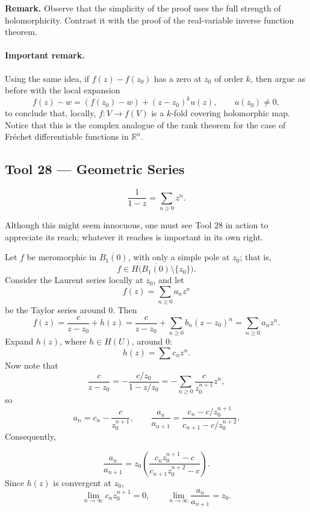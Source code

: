 \documentclass[11pt,a4paper]{article}
\begin{document}
\textbf{Remark.}
Observe that the simplicity of the proof uses the full strength of holomorphicity. Contrast it with the proof of the real-variable inverse function theorem.

\paragraph{Important remark.}
Using the same idea, if $f(z)-f(z_0)$ has a zero at $z_0$ of order $k$, then argue as before with the local expansion
\[
  f(z)-w=(f(z_0)-w)
  +(z-z_0)^k u(z),\qquad u(z_0)\ne0,
\]
to conclude that, locally, \(f:V\to f(V)\) is a $k$-fold covering holomorphic map. Notice that this is the complex analogue of the rank theorem for the case of Fr\'echet differentiable functions in $\mathbb R^n$.

\subsection*{Tool 28 — Geometric Series}

\[
  \frac{1}{1-z}=\sum_{n\ge0}z^n.
\]

Although this might seem innocuous, one must see Tool $28$ in action to appreciate its reach; whatever it reaches is important in its own right.

Let $f$ be meromorphic in $\overline{B_1(0)}$, with only a simple pole at $z_0$; that is,
\[
  f\in H\bigl(\overline{B_1(0)}\setminus\{z_0\}\bigr).
\]
Consider the Laurent series locally at $z_0$, and let
\[
  f(z)=\sum_{n\ge0}a_nz^n
\]
be the Taylor series around $0$. Then
\[
  f(z)=\frac{c}{z-z_0}+h(z)
  =\frac{c}{z-z_0}+\sum_{n\ge0}b_n(z-z_0)^n
  =\sum_{n\ge0}a_nz^n.
\]
Expand $h(z)$, where $h\in H(U)$, around $0$:
\[
  h(z)=\sum c_nz^n.
\]
Now note that
\[
  \frac{c}{z-z_0}
  =-\frac{c/z_0}{1-z/z_0}
  =-\sum_{n\ge0}\frac{c}{z_0^{n+1}}z^n,
\]
so
\[
  a_n=c_n-\frac{c}{z_0^{n+1}},
  \qquad
  \frac{a_n}{a_{n+1}}
  =\frac{c_n-c/z_0^{n+1}}{c_{n+1}-c/z_0^{n+2}}.
\]
Consequently,

\[
  \frac{a_n}{a_{n+1}}
  =z_0\left(\frac{c_nz_0^{n+1}-c}{c_{n+1}z_0^{n+2}-c}\right).
\]
Since $h(z)$ is convergent at $z_0$,
\[
  \lim_{n\to\infty}c_nz_0^{n+1}=0,
  \qquad
  \lim_{n\to\infty}\frac{a_n}{a_{n+1}}=z_0.
\]
\end{document}

